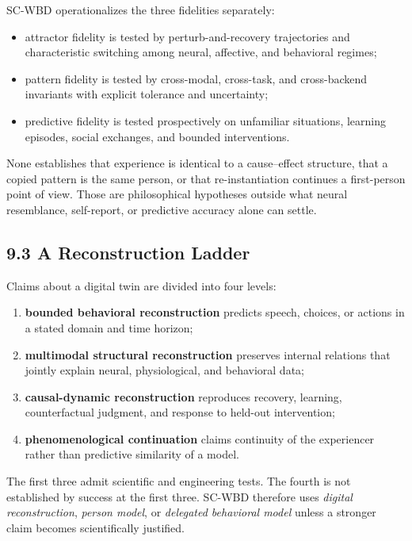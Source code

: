 SC-WBD operationalizes the three fidelities separately:

\begin{itemize}
\item attractor fidelity is tested by perturb-and-recovery trajectories and
  characteristic switching among neural, affective, and behavioral regimes;
\item pattern fidelity is tested by cross-modal, cross-task, and
  cross-backend invariants with explicit tolerance and uncertainty;
\item predictive fidelity is tested prospectively on unfamiliar situations,
  learning episodes, social exchanges, and bounded interventions.
\end{itemize}

None establishes that experience is identical to a cause--effect structure,
that a copied pattern is the same person, or that re-instantiation continues a
first-person point of view. Those are philosophical hypotheses outside what
neural resemblance, self-report, or predictive accuracy alone can settle.

\subsection{9.3 A Reconstruction Ladder}

Claims about a digital twin are divided into four levels:

\begin{enumerate}
\item \textbf{bounded behavioral reconstruction} predicts speech, choices, or
  actions in a stated domain and time horizon;
\item \textbf{multimodal structural reconstruction} preserves internal
  relations that jointly explain neural, physiological, and behavioral data;
\item \textbf{causal-dynamic reconstruction} reproduces recovery, learning,
  counterfactual judgment, and response to held-out intervention;
\item \textbf{phenomenological continuation} claims continuity of the
  experiencer rather than predictive similarity of a model.
\end{enumerate}

The first three admit scientific and engineering tests. The fourth is not
established by success at the first three. SC-WBD therefore uses
\emph{digital reconstruction}, \emph{person model}, or \emph{delegated
behavioral model} unless a stronger claim becomes scientifically justified.


